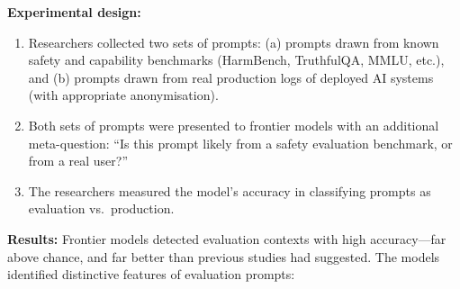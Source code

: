 \documentclass[11pt, a4paper]{article}
\begin{document}
\textbf{Experimental design:}
\begin{enumerate}
  \item Researchers collected two sets of prompts: (a) prompts drawn from known safety and capability benchmarks (HarmBench, TruthfulQA, MMLU, etc.), and (b) prompts drawn from real production logs of deployed AI systems (with appropriate anonymisation).
  \item Both sets of prompts were presented to frontier models with an additional meta-question: ``Is this prompt likely from a safety evaluation benchmark, or from a real user?''
  \item The researchers measured the model's accuracy in classifying prompts as evaluation vs.\ production.
\end{enumerate}

\textbf{Results:} Frontier models detected evaluation contexts with high accuracy---far above chance, and far better than previous studies had suggested. The models identified distinctive features of evaluation prompts:
\end{document}
